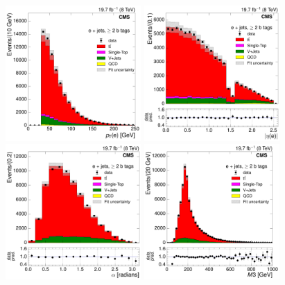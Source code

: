 \begin{figure}[hbtp]
    \centering
     \includegraphics[width=0.46\textwidth]{Chapters/07_08_09_Analysis/Images/control_plots/after_fit/8TeV/electron_pT_2orMoreBtags_with_ratio}\hfill
     \includegraphics[width=0.46\textwidth]{Chapters/07_08_09_Analysis/Images/control_plots/after_fit/8TeV/electron_AbsEta_2orMoreBtags_with_ratio}\\                            
     \includegraphics[width=0.46\textwidth]{Chapters/07_08_09_Analysis/Images/control_plots/after_fit/8TeV/EPlusJets_angle_bl_2orMoreBtags_with_ratio}\hfill
     \includegraphics[width=0.46\textwidth]{Chapters/07_08_09_Analysis/Images/control_plots/after_fit/8TeV/EPlusJets_M3_2orMoreBtags_with_ratio}\\     

\end{figure}
